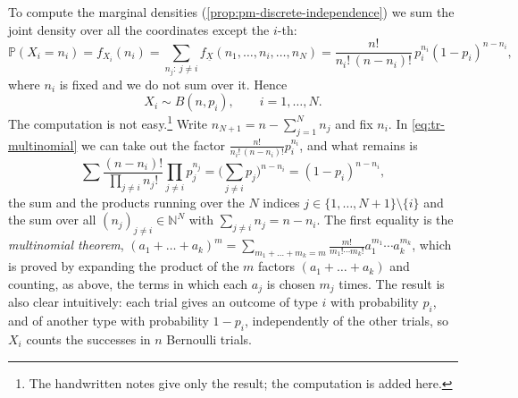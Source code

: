 \begin{remark}\label{rem:tr-multinomial-marginals}
To compute the marginal densities (\cref{prop:pm-discrete-independence}) we sum the joint density
over all the coordinates except the $i$-th:
\[
  \mathbb P(X_i=n_i)=f_{X_i}(n_i)=\sum_{n_j:\ j\ne i}f_{\underline X}(n_1,\dots,n_i,\dots,n_N)
  =\frac{n!}{n_i!\,(n-n_i)!}\,p_i^{n_i}(1-p_i)^{n-n_i},
\]
where $n_i$ is fixed and we do not sum over it. Hence
\[
  X_i\sim B(n,p_i),\qquad i=1,\dots,N .
\]
The computation is not easy.\footnote{The handwritten notes give only the result; the computation
is added here.} Write $n_{N+1}=n-\sum_{j=1}^Nn_j$ and fix $n_i$. In
\eqref{eq:tr-multinomial} we can take out the factor $\frac{n!}{n_i!\,(n-n_i)!}p_i^{n_i}$, and what
remains is
\[
  \sum\frac{(n-n_i)!}{\prod_{j\ne i}n_j!}\prod_{j\ne i}p_j^{n_j}=\Big(\sum_{j\ne i}p_j\Big)^{n-n_i}=(1-p_i)^{n-n_i},
\]
the sum and the products running over the $N$ indices $j\in\{1,\dots,N+1\}\setminus\{i\}$ and the sum over
all $(n_j)_{j\ne i}\in\mathbb N^N$ with $\sum_{j\ne i}n_j=n-n_i$. The first equality is the
\emph{multinomial theorem},
$(a_1+\dots+a_k)^m=\sum_{m_1+\dots+m_k=m}\frac{m!}{m_1!\cdots m_k!}a_1^{m_1}\cdots a_k^{m_k}$, which
is proved by expanding the product of the $m$ factors $(a_1+\dots+a_k)$ and counting, as above,
the terms in which each $a_j$ is chosen $m_j$ times. The result is also clear intuitively: each
trial gives an outcome of type $i$ with probability $p_i$, and of another type with probability
$1-p_i$, independently of the other trials, so $X_i$ counts the successes in $n$ Bernoulli trials.
\end{remark}

